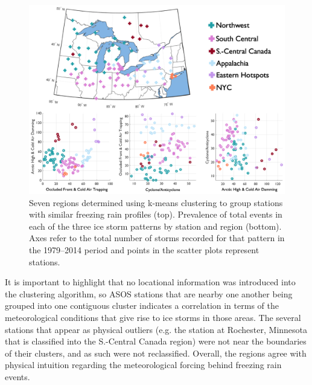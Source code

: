 \documentclass[twocol]{ametsoc}
\begin{document}
\begin{figure}
\centering
\includegraphics[width=1\textwidth]{regional_Breakdown.png}
\caption{\label{fig:regional_breakdown} Seven regions determined using k-means clustering to group stations with similar freezing rain profiles (top). Prevalence of total events in each of the three ice storm patterns by station and region (bottom). Axes refer to the total number of storms recorded for that pattern in the 1979–2014 period and points in the scatter plots represent stations.}
\end{figure}

It is important to highlight that no locational information was introduced into the clustering algorithm, so ASOS stations that are nearby one another being grouped into one contiguous cluster indicates a correlation in terms of the meteorological conditions that give rise to ice storms in those areas. The several stations that appear as physical outliers (e.g. the station at Rochester, Minnesota that is classified into the S.-Central Canada region) were not near the boundaries of their clusters, and as such were not reclassified. Overall, the regions agree with physical intuition regarding the meteorological forcing behind freezing rain events. 
\end{document}
